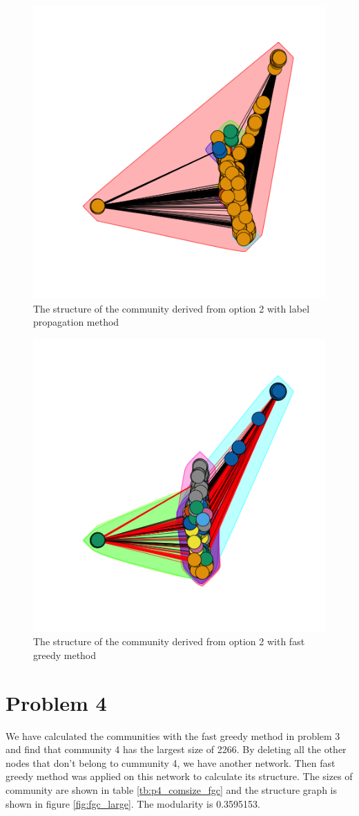 \documentclass{article}
\begin{document}
\begin{figure}[htbp]
\centering
\captionsetup{justification=centering,margin=2cm}
\includegraphics[width=.6\textwidth]{lpc_opt2.png}
\caption{The structure of the community derived from option 2 with label propagation method}
\label{fig:lpc_opt2}
\end{figure}

\begin{figure}[htbp]
\centering
\captionsetup{justification=centering,margin=2cm}
\includegraphics[width=.6\textwidth]{fgc_opt2.png}
\caption{The structure of the community derived from option 2 with fast greedy method}
\label{fig:fgc_opt2}
\end{figure}


\section{Problem 4}
We have calculated the communities with the fast greedy method in problem 3 and find that community 4 has the largest size of 2266. By deleting all the other nodes that don't belong to cummunity 4, we have another network. Then fast greedy method was applied on this network to calculate its structure. The sizes of community are shown in table \ref{tb:p4_comsize_fgc} and the structure graph is shown in figure \ref{fig:fgc_large}. The modularity is 0.3595153.
\end{document}
